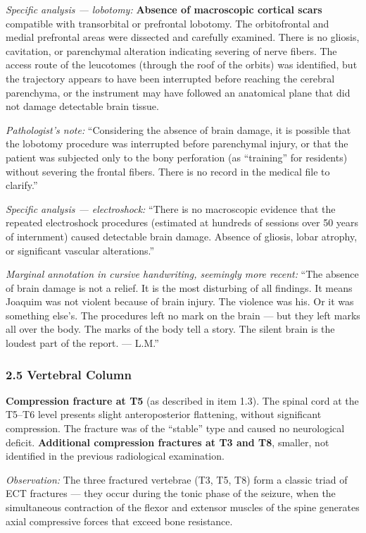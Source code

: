 \noindent \textit{Specific analysis --- lobotomy:} \textbf{Absence of macroscopic cortical scars} compatible with transorbital or prefrontal lobotomy. The orbitofrontal and medial prefrontal areas were dissected and carefully examined. There is no gliosis, cavitation, or parenchymal alteration indicating severing of nerve fibers. The access route of the leucotomes (through the roof of the orbits) was identified, but the trajectory appears to have been interrupted before reaching the cerebral parenchyma, or the instrument may have followed an anatomical plane that did not damage detectable brain tissue.

\noindent \textit{Pathologist's note:} ``Considering the absence of brain damage, it is possible that the lobotomy procedure was interrupted before parenchymal injury, or that the patient was subjected only to the bony perforation (as ``training'' for residents) without severing the frontal fibers. There is no record in the medical file to clarify.''

\noindent \textit{Specific analysis --- electroshock:} ``There is no macroscopic evidence that the repeated electroshock procedures (estimated at hundreds of sessions over 50 years of internment) caused detectable brain damage. Absence of gliosis, lobar atrophy, or significant vascular alterations.''

\noindent \textit{Marginal annotation in cursive handwriting, seemingly more recent:} ``The absence of brain damage is not a relief. It is the most disturbing of all findings. It means Joaquim was not violent because of brain injury. The violence was his. Or it was something else's. The procedures left no mark on the brain --- but they left marks all over the body. The marks of the body tell a story. The silent brain is the loudest part of the report. --- L.M.''

\subsubsection*{2.5 Vertebral Column}

\noindent \textbf{Compression fracture at T5} (as described in item 1.3). The spinal cord at the T5--T6 level presents slight anteroposterior flattening, without significant compression. The fracture was of the ``stable'' type and caused no neurological deficit. \textbf{Additional compression fractures at T3 and T8}, smaller, not identified in the previous radiological examination.

\noindent \textit{Observation:} The three fractured vertebrae (T3, T5, T8) form a classic triad of ECT fractures --- they occur during the tonic phase of the seizure, when the simultaneous contraction of the flexor and extensor muscles of the spine generates axial compressive forces that exceed bone resistance.

